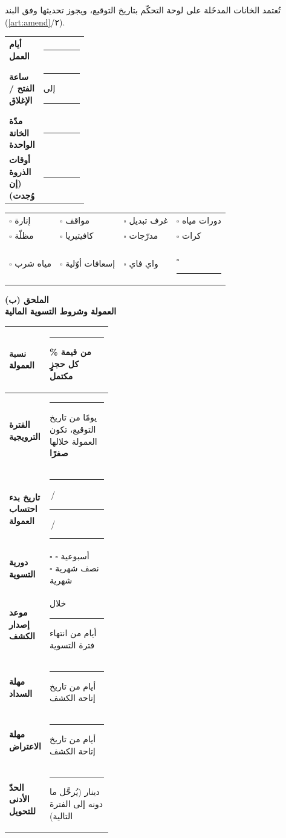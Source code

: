 \documentclass[12pt,a4paper]{article}
\newcommand{\blank}[1][3.2cm]{\rule[-0.4ex]{#1}{0.5pt}}
\newcommand{\mlh}[1]{{\bfseries #1}}
\newcommand{\annex}[2]{%
  \newpage
  \begin{center}
    {\color{teal}\bfseries\Large الملحق (#1)}\\[2pt]
    {\bfseries\large #2}
  \end{center}
  \vspace{4pt}\noindent{\color{teal}\rule{\linewidth}{1pt}}\par\vspace{8pt}%
}
\begin{document}
تُعتمد الخانات المدخَلة على لوحة التحكّم بتاريخ التوقيع، ويجوز تحديثها وفق البند (\ref{art:amend}/٢).

\vspace{6pt}
\begin{tabularx}{\linewidth}{@{}>{\bfseries}p{0.26\linewidth}@{\;:\;}X@{}}
\toprule
أيام العمل            & \blank[8cm]\\
ساعة الفتح / الإغلاق  & \blank[3cm] \quad إلى \quad \blank[3cm]\\
مدّة الخانة الواحدة    & \blank[8cm]\\
أوقات الذروة (إن وُجدت)& \blank[8cm]\\
\bottomrule
\end{tabularx}

\vspace{12pt}
\noindent\mlh{٤. المرافق المعلَنة}
\vspace{4pt}

\begin{tabularx}{\linewidth}{@{}XXXX@{}}
$\square$ إنارة & $\square$ مواقف & $\square$ غرف تبديل & $\square$ دورات مياه\\[5pt]
$\square$ مظلّة & $\square$ كافيتيريا & $\square$ مدرّجات & $\square$ كرات\\[5pt]
$\square$ مياه شرب & $\square$ إسعافات أوّلية & $\square$ واي فاي & $\square$ \blank[2.4cm]\\
\end{tabularx}

\annex{ب}{العمولة وشروط التسوية المالية}

\begin{tabularx}{\linewidth}{@{}>{\bfseries}p{0.34\linewidth}@{\;:\;}X@{}}
\toprule
نسبة العمولة                & \blank[2cm]\% من قيمة كل حجزٍ مكتمل\\
\midrule
الفترة الترويجية            & \blank[2cm] يومًا من تاريخ التوقيع، تكون العمولة خلالها \mlh{صفرًا}\\
\midrule
تاريخ بدء احتساب العمولة    & \blank[1.4cm]\,/\,\blank[1.4cm]\,/\,\blank[2cm]\\
\midrule
دورية التسوية               & $\square$ أسبوعية \quad $\square$ نصف شهرية \quad $\square$ شهرية\\
\midrule
موعد إصدار الكشف            & خلال \blank[1.6cm] أيام من انتهاء فترة التسوية\\
\midrule
مهلة السداد                 & \blank[1.6cm] أيام من تاريخ إتاحة الكشف\\
\midrule
مهلة الاعتراض               & \blank[1.6cm] أيام من تاريخ إتاحة الكشف\\
\midrule
الحدّ الأدنى للتحويل        & \blank[2cm] دينار (يُرحَّل ما دونه إلى الفترة التالية)\\
\bottomrule
\end{tabularx}
\end{document}
